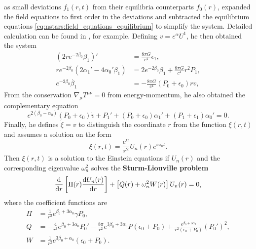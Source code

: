 as small deviations $f_1(r,t)$ from their equilibria counterparts $f_0(r)$, expanded the field equations to first order in the deviations and subtracted the equilibrium equations \eqref{eq:nstars:field_equations_equilibrium} to simplify the system.
Detailed calculation can be found in \cite{ref:stability_multi_fluid}, for example.
Defining $v = e^\alpha U^1$, he then obtained the system \cite{ref:chandrasekhar_stability}
\begin{subequations}
\begin{align}
	(2 r e^{-2 \beta_0} \beta_1)' &= \frac{8 \pi G}{c^4} \epsilon_1 , \\
	r e^{-2 \beta_0} (2 \alpha_1' - 4 \alpha_0' \beta_1) &= 2 e^{-2 \beta_0} \beta_1 + \frac{8 \pi G}{c^4} r^2 P_1 , \\
	e^{-2 \beta_0} \dot{\beta_1} &= -\frac{8 \pi G}{c^4} (P_0 + \epsilon_0) r v ,
\end{align}
\end{subequations}
From the conservation $\nabla_\mu T^{\mu \nu} = 0$ from energy-momentum, he also obtained the complementary equation
\begin{equation}
	e^{2(\beta_0 - \alpha_0)} (P_0 + \epsilon_0) \dot{v} + P_1' + (P_0 + \epsilon_0) \alpha_1' + (P_1 + \epsilon_1) \alpha_0' = 0 .
\end{equation}
Finally, he defines $\dot{\xi} = v$ to distinguish the coordinate $r$ from the function $\xi(r, t)$ and assumes a solution on the form
\begin{equation}
	\xi(r,t) = \frac{e^\alpha}{r^2} U_n(r) e^{i \omega_n t} .
\end{equation}
Then $\xi(r,t)$ is a solution to the Einstein equations if $U_n(r)$ and the corresponding eigenvalue $\omega_n^2$ solves the \textbf{Sturm-Liouville problem}
\begin{equation}
	\odv*{ \left[ \Pi(r) \odv{U_n(r)}{r} \right] }{r} + \left[ Q(r) + \omega_n^2 W(r) \right] U_n(r) = 0 ,
\label{eq:nstars:sturm_liouville}
\end{equation}
where the coefficient functions are
\begin{subequations}
\begin{align}
	\Pi &= \frac{1}{r^2} e^{\beta_0 + 3 \alpha_0} \gamma P_0 , \\
	Q   &= -\frac{4}{r^3} e^{\beta_0 + 3 \alpha_0} P_0' - \frac{8 \pi}{r^2} e^{3 \beta_0 + 3 \alpha_0} P (\epsilon_0 + P_0) + \frac{e^{\beta_0 + 3 \alpha_0}}{r^2(\epsilon_0 + P_0)} (P_0')^2 , \\
	W   &= \frac{1}{r^2} e^{3 \beta_0 + \alpha_0} (\epsilon_0 + P_0) .
\end{align}
\label{eq:nstars:sturm_liouville_coefficients}
\end{subequations}

